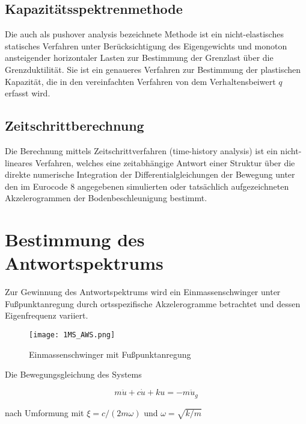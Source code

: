 \subsection{Kapazitätsspektrenmethode}
\label{sec:Kapazitaetsspektrenmethode}

Die auch als \glqq pushover analysis\grqq{} bezeichnete Methode ist ein nicht-elastisches statisches Verfahren unter Berücksichtigung des Eigengewichts und monoton ansteigender horizontaler Lasten zur Bestimmung der Grenzlast über die Grenzduktilität.
Sie ist ein genaueres Verfahren zur Bestimmung der plastischen Kapazität, die in den vereinfachten Verfahren von dem Verhaltensbeiwert $q$ erfasst wird.

\subsection{Zeitschrittberechnung}
\label{sec:Zeitschrittberechnung}

Die Berechnung mittels Zeitschrittverfahren (\glqq time-history analysis\grqq{}) ist ein nicht-lineares Verfahren, welches eine zeitabhängige Antwort einer Struktur über die direkte numerische Integration der Differentialgleichungen der Bewegung unter den im Eurocode 8 angegebenen simulierten oder tatsächlich aufgezeichneten Akzelerogrammen der Bodenbeschleunigung bestimmt. 

\pagebreak

\section{Bestimmung des Antwortspektrums}
\label{sec:Antwortspektren}

Zur Gewinnung des Antwortspektrums wird ein Einmassenschwinger unter Fußpunktanregung durch ortsspezifische Akzelerogramme betrachtet und dessen Eigenfrequenz variiert.

\begin{figure}[H]
    \centering
    \texttt{[image: 1MS\_AWS.png]}
    \caption{Einmassenschwinger mit Fußpunktanregung}
\end{figure}

Die Bewegungsgleichung des Systems

\begin{equation} \label{ems_aws}
m \ddot u + c \dot u + k u = -m \ddot u_g
\end{equation}

nach Umformung mit $\xi = c/(2m\omega)$ und $\omega = \sqrt{k/m}$

